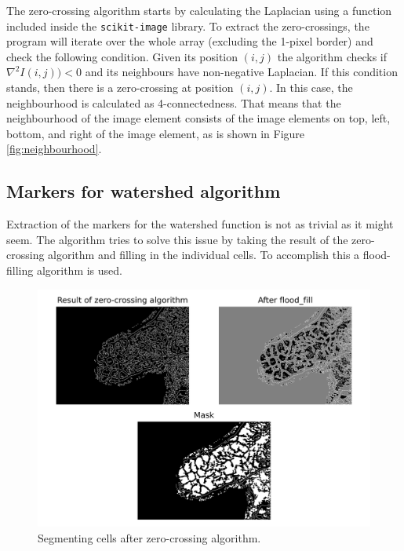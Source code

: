 \documentclass[
  digital,     %
  oneside,     %
  nosansbold,  %
  nocolorbold, %
  lof,         %
  lot,         %
]{fithesis4}
\begin{document}
The zero-crossing algorithm starts by calculating the Laplacian using a function
included inside the \texttt{scikit-image} library. To
extract the zero-crossings, the program will iterate over the whole array
(excluding the 1-pixel border) and check the following condition. Given its position $(i, j)$
the algorithm checks if $\nabla^2 I(i, j)) < 0$ and its neighbours have
non-negative Laplacian.  If this condition stands, then there is
a zero-crossing at position $(i, j)$. In this case, the neighbourhood is
calculated as 4-connectedness. That means that the neighbourhood of the image element
consists of the image elements on top, left, bottom, and right of the image element, as is
shown in Figure \ref{fig:neighbourhood}.

\subsection{Markers for watershed algorithm}
\label{sec-markers}
Extraction of the markers for the watershed function is not as trivial as it
might seem. The algorithm tries to solve this issue by taking the result of the
zero-crossing algorithm and filling in the individual cells. To accomplish this
a flood-filling algorithm is used.

\begin{figure}
    \begin{center}
        \includegraphics[width=\linewidth]{resources/flood_fill.png}
    \end{center}
    \caption{Segmenting cells after zero-crossing algorithm.}
    \label{fig:flood_fill}
\end{figure}
\end{document}
